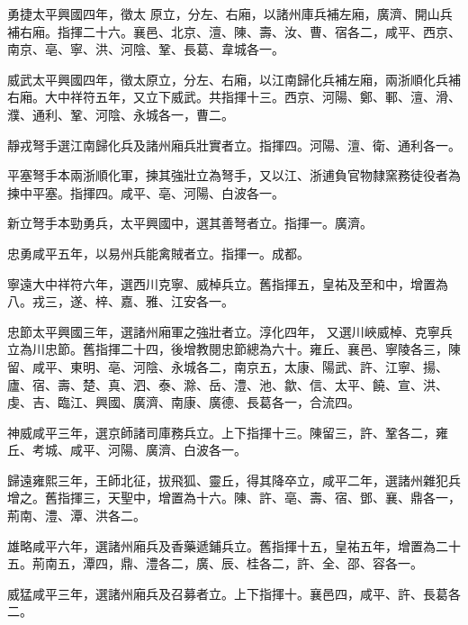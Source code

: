 \begin{pinyinscope}
 勇捷太平興國四年，徵太
 原立，分左、右廂，以諸州庫兵補左廂，廣濟、開山兵補右廂。指揮二十六。襄邑、北京、澶、陳、壽、汝、曹、宿各二，咸平、西京、南京、亳、寧、洪、河陰、鞏、長葛、韋城各一。



 威武太平興國四年，徵太原立，分左、右廂，以江南歸化兵補左廂，兩浙順化兵補右廂。大中祥符五年，又立下威武。共指揮十三。西京、河陽、鄭、鄆、澶、滑、濮、通利、鞏、河陰、永城各一，曹二。



 靜戎弩手選江南歸化兵及諸州廂兵壯實者立。指揮四。河陽、澶、衛、通利各一。



 平塞弩手本兩浙順化軍，揀其強壯立為弩手，又以江、浙逋負官物隸窯務徒役者為揀中平塞。指揮四。咸平、亳、河陽、白波各一。



 新立弩手本勁勇兵，太平興國中，選其善弩者立。指揮一。廣濟。



 忠勇咸平五年，以易州兵能禽賊者立。指揮一。成都。



 寧遠大中祥符六年，選西川克寧、威棹兵立。舊指揮五，皇祐及至和中，增置為八。戎三，遂、梓、嘉、雅、江安各一。



 忠節太平興國三年，選諸州廂軍之強壯者立。淳化四年，
 又選川峽威棹、克寧兵立為川忠節。舊指揮二十四，後增教閱忠節總為六十。雍丘、襄邑、寧陵各三，陳留、咸平、東明、亳、河陰、永城各二，南京五，太康、陽武、許、江寧、揚、廬、宿、壽、楚、真、泗、泰、滁、岳、澧、池、歙、信、太平、饒、宣、洪、虔、吉、臨江、興國、廣濟、南康、廣德、長葛各一，合流四。



 神威咸平三年，選京師諸司庫務兵立。上下指揮十三。陳留三，許、鞏各二，雍丘、考城、咸平、河陽、廣濟、白波各一。



 歸遠雍熙三年，王師北征，拔飛狐、靈丘，得其降卒立，咸平二年，選諸州雜犯兵增之。舊指揮三，天聖中，增置為十六。陳、許、亳、壽、宿、鄧、襄、鼎各一，荊南、澧、潭、洪各二。



 雄略咸平六年，選諸州廂兵及香藥遞鋪兵立。舊指揮十五，皇祐五年，增置為二十五。荊南五，潭四，鼎、澧各二，廣、辰、桂各二，許、全、邵、容各一。



 威猛咸平三年，選諸州廂兵及召募者立。上下指揮十。襄邑四，咸平、許、長葛各二。




\end{pinyinscope}
